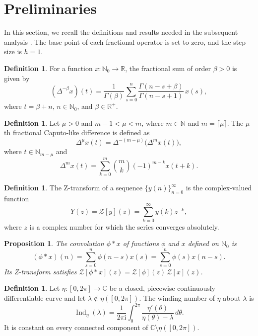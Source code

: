 \documentclass[11pt,a4paper]{article}
\newtheorem{prop}[thm]{Proposition}
\theoremstyle{definition}
\newtheorem{deff}[thm]{Definition}
\begin{document}
\section{Preliminaries}
In this section, we recall the definitions and results needed in the subsequent analysis \cite{mozyrska2015z,elaydi2005introduction}. The base point of each fractional operator is set to zero, and the step size is $h = 1$.
\begin{deff} \cite{mozyrska2015z}
 For a function $x:\mathbb{N}_0 \to \mathbb{R}$, the fractional sum of order $\beta > 0$ is given by
	\begin{equation*} 
		(\Delta^{-\beta} x)(t)
		=\frac{1}{\Gamma(\beta)} 
		\sum_{s=0}^{n} \frac{\Gamma(n-s+\beta)}{\Gamma(n-s+1)}\, x(s),
	\end{equation*}
	where $t = \beta + n$, $n \in \mathbb{N}_0$, and $\beta \in \mathbb{R}^{+}$.
\end{deff}
\begin{deff} \cite{mozyrska2015z} 
	Let $\mu > 0$ and $m - 1 < \mu < m$, where $m \in \mathbb{N}$ and $m = \lceil\mu\rceil$.
	The $\mu$th fractional Caputo-like difference is defined as
	\begin{equation*}
		\Delta^\mu x(t) = \Delta^{-(m-\mu)}\bigl(\Delta^m x(t)\bigr),
	\end{equation*}
	where $t \in \mathbb{N}_{m-\mu}$ and
	\begin{equation*}
		\Delta^m x(t) = \sum_{k=0}^m \binom{m}{k}(-1)^{m-k}x(t+k).
	\end{equation*}
\end{deff}
\begin{deff}\cite{elaydi2005introduction,mozyrska2015z} 
	The Z-transform of a sequence $\{y(n)\}_{n=0}^\infty$ is the complex-valued function
	\[
	Y(z) = \mathcal{Z}[y](z) = \sum_{k=0}^\infty y(k)z^{-k},
	\]
	where $z$ is a complex number for which the series converges absolutely.
\end{deff}
\begin{prop}\cite{elaydi2005introduction,mozyrska2015z}
	The convolution $\phi \ast x$ of functions $\phi$ and $x$ defined on $\mathbb{N}_0$ is
	\[
	(\phi \ast x)(n) = \sum_{s=0}^n \phi(n-s)x(s) = \sum_{s=0}^n \phi(s)x(n-s).
	\]
	Its Z-transform satisfies $\mathcal{Z}[\phi \ast x](z) = \mathcal{Z}[\phi](z)\,\mathcal{Z}[x](z)$.
\end{prop}
\begin{deff}\cite{rudin1987real}
	Let $\eta:[0,2\pi]\to\mathbb{C}$ be a closed, piecewise continuously differentiable curve and let $\lambda\notin\eta([0,2\pi])$. The winding number of $\eta$ about $\lambda$ is
	\begin{equation*}
		\operatorname{Ind}_{\eta}(\lambda)
		= \frac{1}{2\pi\mathrm{i}}\int_{0}^{2\pi}
		\frac{\eta'(\theta)}{\eta(\theta)-\lambda}\,d\theta.
	\end{equation*}
	It is constant on every connected component of $\mathbb{C}\setminus\eta([0,2\pi])$.
\end{deff}
\end{document}
